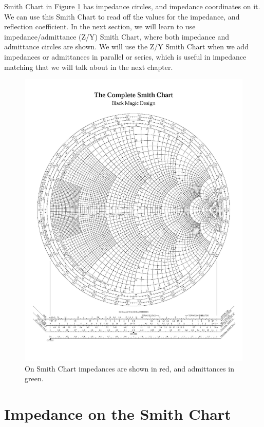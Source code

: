 \documentclass{ximera}
\begin{document}
 Smith Chart in Figure \ref{fig:SCDerscadmimp} has impedance  circles, and impedance coordinates on it.  We can use this Smith Chart to read off the values for the impedance, and reflection coefficient. In the next section, we will learn to use impedance/admittance (Z/Y) Smith Chart, where both impedance and admittance circles are shown. We will use the Z/Y Smith Chart when we add impedances or admittances in parallel or series, which is useful in impedance matching that we will talk about in the next chapter. 


\begin{figure}[htbp]
\begin{center}
\includegraphics[scale=0.1]{../jpg/SmithChartImped-01.jpg}
\end{center}
\caption{On Smith Chart impedances are shown in red, and admittances in green.}
\label{fig:SCDerscadmimp}
\end{figure}



\section{Impedance on the Smith Chart} 
\end{document}
